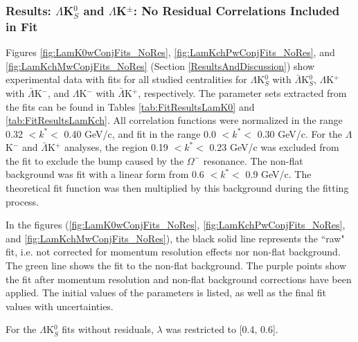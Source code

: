 \documentclass[../AnalysisNoteJBuxton.tex]{subfiles}
\begin{document}
\subsubsection{Results: \texorpdfstring{$\Lambda$K$^{0}_{S}$ and $\Lambda$K$^{\pm}$: No Residual Correlations Included in Fit}{TEXT}}
\label{ResultsLamK_NoRes}

Figures \ref{fig:LamK0wConjFits_NoRes}, \ref{fig:LamKchPwConjFits_NoRes}, and \ref{fig:LamKchMwConjFits_NoRes} (Section \ref{ResultsAndDiscussion}) show experimental data with fits for all studied centralities for $\Lambda$K$^{0}_{S}$ with $\bar{\Lambda}$K$^{0}_{S}$, $\Lambda$K$^{+}$ with $\bar{\Lambda}$K$^{-}$, and $\Lambda$K$^{-}$ with $\bar{\Lambda}$K$^{+}$, respectively.
The parameter sets extracted from the fits can be found in Tables \ref{tab:FitResultsLamK0} and \ref{tab:FitResultsLamKch}.
All correlation functions were normalized in the range 0.32 $< k^{*} <$ 0.40 GeV/c, and fit in the range 0.0 $< k^{*} <$ 0.30 GeV/c.
For the $\Lambda$K$^{-}$ and $\bar{\Lambda}$K$^{+}$ analyses, the region 0.19 $< k^{*} <$ 0.23 GeV/c was excluded from the fit to exclude the bump caused by the $\Omega^{-}$ resonance.
The non-flat background was fit with a linear form from 0.6 $< k^{*} <$ 0.9 GeV/c.
The theoretical fit function was then multiplied by this background during the fitting process.

In the figures (\ref{fig:LamK0wConjFits_NoRes}, \ref{fig:LamKchPwConjFits_NoRes}, and \ref{fig:LamKchMwConjFits_NoRes}), the black solid line represents the ``raw" fit, i.e. not corrected for momentum resolution effects nor non-flat background.
The green line shows the fit to the non-flat background.  The purple points show the fit after momentum resolution and non-flat background corrections have been applied.
The initial values of the parameters is listed, as well as the final fit values with uncertainties.

For the $\Lambda$K$^{0}_{S}$ fits without residuals, $\lambda$ was restricted to [0.4, 0.6].
\end{document}
